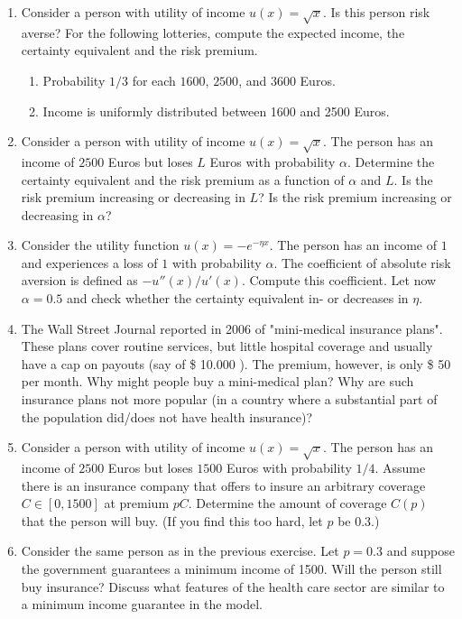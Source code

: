\documentclass[a4paper]{article}
\begin{document}
\begin{enumerate}[resume]
\item Consider a person with utility of income \(u(x)=\sqrt{x}\). Is this person risk averse? For the following lotteries, compute the expected income, the certainty equivalent and the risk premium.
\begin{enumerate}
\item Probability \(1/3\) for each \(1600\), \(2500\), and \(3600\) Euros.
\item Income is uniformly distributed between 1600 and 2500 Euros.
\end{enumerate}

\item Consider a person with utility of income \(u(x)=\sqrt{x}\). The person has an income of \(2500\) Euros but loses \(L\) Euros with probability \(\alpha\). Determine the certainty equivalent and the risk premium as a function of \(\alpha\) and \(L\). Is the risk premium increasing or decreasing in \(L\)? Is  the risk premium increasing or decreasing in \(\alpha\)?

\item Consider the utility function \(u(x)=-e^{-\eta x}\). The person has an income of \(1\) and experiences a loss of \(1\) with probability \(\alpha\).  The coefficient of absolute risk aversion is defined as \(-u''(x)/u'(x)\). Compute this coefficient. Let now \(\alpha=0.5\) and check whether the certainty equivalent in- or decreases in \(\eta\).

\item The Wall Street Journal reported in 2006 of "mini-medical insurance plans". These plans cover routine services, but little hospital coverage and usually have a cap on payouts (say of \$ 10.000 ). The premium, however, is only \$ 50 per month. Why might people buy a mini-medical plan? Why are such insurance plans not more popular (in a country where a substantial part of the population did/does not have health insurance)?

\item Consider a person with utility of income \(u(x)=\sqrt{x}\). The person has an income of \(2500\) Euros but loses \(1500\) Euros with probability \(1/4\). Assume there is an insurance company that offers to insure an arbitrary coverage \(C\in[0,1500]\) at premium \(pC\). Determine the amount of coverage \(C(p)\) that the person will buy. (If you find this too hard, let \(p\) be 0.3.)

\item Consider the same person as in the previous exercise. Let \(p=0.3\) and suppose the government guarantees a minimum income of 1500. Will the person still buy insurance? Discuss what features of the health care sector are similar to a minimum income guarantee in the model.
\end{enumerate}
\end{document}
